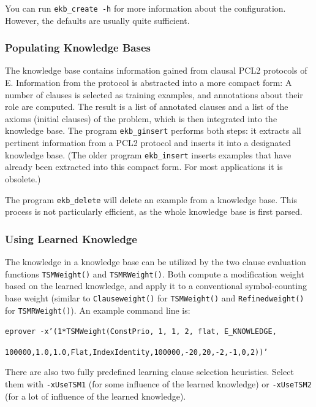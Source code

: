 \documentclass{report}
\begin{document}
You can run \texttt{ekb\_create -h} for more information about the
configuration. However, the defaults are usually quite sufficient.


\subsubsection{Populating Knowledge Bases}

The knowledge base contains information gained from clausal PCL2
protocols of E. Information from the protocol is abstracted into a
more compact form: A number of clauses is selected as training
examples, and annotations about their role are computed. The result is
a list of annotated clauses and a list of the axioms (initial clauses)
of the problem, which is then integrated into the knowledge base. The
program \texttt{ekb\_ginsert} performs both steps: it extracts all
pertinent information from a PCL2 protocol and inserts it into a
designated knowledge base. (The older program \texttt{ekb\_insert}
inserts examples that have already been extracted into this compact
form. For most applications it is obsolete.)

The program \texttt{ekb\_delete} will delete an example from a
knowledge base. This process is not particularly efficient, as the
whole knowledge base is first parsed.


\subsubsection{Using Learned Knowledge}

The knowledge in a knowledge base can be utilized by the two clause
evaluation functions \texttt{TSMWeight()} and \texttt{TSMRWeight()}.
Both compute a modification weight based on the learned knowledge, and
apply it to a conventional symbol-counting base weight (similar to
\texttt{Clauseweight()} for \texttt{TSMWeight()} and
\texttt{Refinedweight()} for \texttt{TSMRWeight()}). An example command
line is:

\texttt{eprover -x'(1*TSMWeight(ConstPrio, 1, 1, 2, flat,
  E\_KNOWLEDGE,}

\texttt{100000,1.0,1.0,Flat,IndexIdentity,100000,-20,20,-2,-1,0,2))'}

There are also two fully predefined learning clause selection
heuristics. Select them with \texttt{-xUseTSM1} (for some influence of
the learned knowledge) or \texttt{-xUseTSM2} (for a lot of influence
of the learned knowledge).
\end{document}
